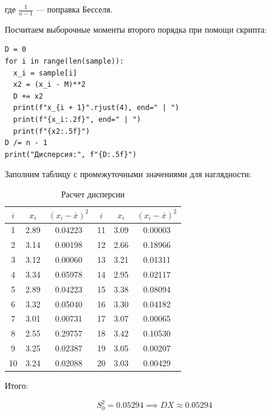 где \( \frac{1}{n-1} \) --- поправка Бесселя.

Посчитаем выборочные моменты второго порядка при помощи скрипта:
\begin{lstlisting}
D = 0
for i in range(len(sample)):
  x_i = sample[i]
  x2 = (x_i - M)**2
  D += x2
  print(f"x_{i + 1}".rjust(4), end=" | ")
  print(f"{x_i:.2f}", end=" | ")
  print(f"{x2:.5f}")
D /= n - 1
print("Дисперсия:", f"{D:.5f}")
\end{lstlisting}

Заполним таблицу с промежуточными значениями для наглядности:

\begin{table}[h!]
\centering
\begin{tabular}{|c|c|c||c|c|c|}
\hline
$i$ & $x_i$ & $(x_i - \bar{x})^2$ & $i$ & $x_i$ & $(x_i - \bar{x})^2$ \\ \hline \hline
1 & 2.89 & 0.04223 & 11 & 3.09 & 0.00003 \\ \hline
2 & 3.14 & 0.00198 & 12 & 2.66 & 0.18966 \\ \hline
3 & 3.12 & 0.00060 & 13 & 3.21 & 0.01311 \\ \hline
4 & 3.34 & 0.05978 & 14 & 2.95 & 0.02117 \\ \hline
5 & 2.89 & 0.04223 & 15 & 3.38 & 0.08094 \\ \hline
6 & 3.32 & 0.05040 & 16 & 3.30 & 0.04182 \\ \hline
7 & 3.01 & 0.00731 & 17 & 3.07 & 0.00065 \\ \hline
8 & 2.55 & 0.29757 & 18 & 3.42 & 0.10530 \\ \hline
9 & 3.25 & 0.02387 & 19 & 3.05 & 0.00207 \\ \hline
10 & 3.24 & 0.02088 & 20 & 3.03 & 0.00429 \\ \hline
\end{tabular}
\caption{Расчет дисперсии}
\end{table}

Итого:

\[ 
    S_0^2=0.05294
    \implies\boxed{
        DX\approx 0.05294
    }
\]